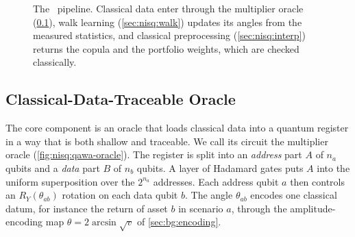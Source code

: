 \begin{figure}[htbp]
\centering
{}
\caption{The \qawa\ pipeline. Classical data enter through the multiplier oracle (\cref{sec:nisq:oracle}), walk learning (\cref{sec:nisq:walk}) updates its angles from the measured statistics, and classical preprocessing (\cref{sec:nisq:interp}) returns the copula and the portfolio weights, which are checked classically.}
\label{fig:nisq:qawa-pipeline}
\end{figure}

\subsection{Classical-Data-Traceable Oracle}\label{sec:nisq:oracle}

The core component is an oracle that loads classical data into a quantum register in a way that is both shallow and traceable. We call its circuit the multiplier oracle (\cref{fig:nisq:qawa-oracle}). The register is split into an \emph{address} part $A$ of $n_{a}$ qubits and a \emph{data} part $B$ of $n_{b}$ qubits. A layer of Hadamard gates puts $A$ into the uniform superposition over the $2^{n_{a}}$ addresses. Each address qubit $a$ then controls an $R_{Y}(\theta_{ab})$ rotation on each data qubit $b$. The angle $\theta_{ab}$ encodes one classical datum, for instance the return of asset $b$ in scenario $a$, through the amplitude-encoding map $\theta=2\arcsin\sqrt{v}$ of \cref{sec:bg:encoding}.

